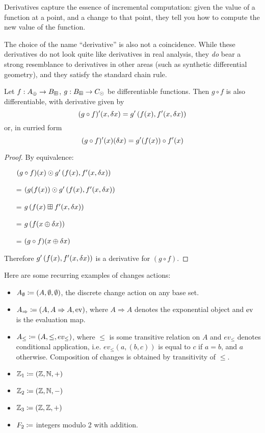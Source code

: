 Derivatives capture the essence of incremental computation: given the value of a
function at a point, and a change to that point, they tell you how to compute
the new value of the function.

The choice of the name ``derivative'' is also not a coincidence. While these
derivatives do not look quite like derivatives in real analysis, they \emph{do}
bear a strong resemblance to derivatives in other areas (such as synthetic differential geometry), and
they satisfy the standard chain rule.

\begin{thm}
  Let $f: A_\oplus \rightarrow B_\boxplus$, $g: B_\boxplus \rightarrow C_\odot$ be differentiable functions. Then $g \circ f$ is also
  differentiable, with derivative given by
   $$(g \circ f)'(x, \delta x) = g'\left(f(x), f'(x, \delta x)\right)$$
   or, in curried form
   $$(g \circ f)'(x)(\delta x) = g'(f(x)) \circ f'(x)$$
\end{thm}
\ifproofs
\begin{proof}
  By equivalence:
  \begin{itemize}
    \item[ ]$(g \circ f)(x) \odot g'\left(f(x), f'(x,\delta x)\right)$
    \item[=]$(g(f(x)) \odot g'\left(f(x), f'(x,\delta x)\right)$
    \item[=]$g\left(f(x) \boxplus f'(x, \delta x) \right)$
    \item[=]$g\left(f(x \oplus \delta x)\right)$
    \item[=]$(g \circ f)(x \oplus \delta x)$
  \end{itemize}
  Therefore $g'\left(f(x), f'(x, \delta x)\right)$ is a
  derivative for $(g \circ f)$.
\end{proof}
\fi

Here are some recurring examples of changes actions:
\begin{itemize}
  \item $A_\emptyset \coloneqq (A,\emptyset,\emptyset)$, the discrete change action on any base set.
  \item $A_\Rightarrow \coloneqq (A,A\Rightarrow A,\operatorname{ev})$, where $A
    \Rightarrow A$ denotes the exponential object and $\operatorname{ev}$ is the evaluation map.
  \item $A_\leq \coloneqq (A,\leq,ev_\leq)$, where $\leq$ is some
    transitive relation on $A$ and $ev_\leq$ denotes
    conditional application, i.e. $ev_\leq(a, (b, c))$ is equal to $c$ if $a = b$, and $a$ otherwise. Composition of changes is obtained
    by transitivity of $\leq$.
  \item $\mathbb{Z}_1 \coloneqq (\mathbb{Z},\mathbb{N},+)$
  \item $\mathbb{Z}_2 \coloneqq (\mathbb{Z},\mathbb{N},-)$
  \item $\mathbb{Z}_3 \coloneqq (\mathbb{Z},\mathbb{Z},+)$
  \item $F_2 \coloneqq$ integers modulo 2 with addition.
\end{itemize}

